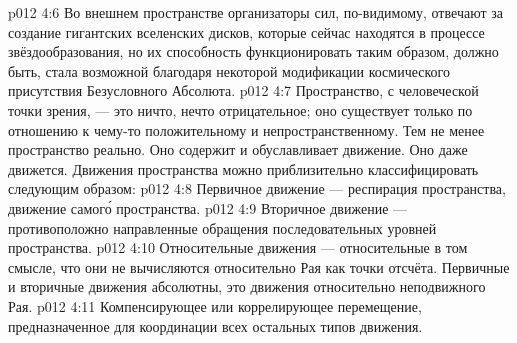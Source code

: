 \vs p012 4:6 \pc Во внешнем пространстве организаторы сил, по\hyp{}видимому, отвечают за создание гигантских вселенских дисков, которые сейчас находятся в процессе звёздообразования, но их способность функционировать таким образом, должно быть, стала возможной благодаря некоторой модификации космического присутствия Безусловного Абсолюта.
\vs p012 4:7 \pc Пространство, с человеческой точки зрения, --- это ничто, нечто отрицательное; оно существует только по отношению к чему\hyp{}то положительному и непространственному. Тем не менее пространство реально. Оно содержит и обуславливает движение. Оно даже движется. Движения пространства можно приблизительно классифицировать следующим образом:
\vs p012 4:8 Первичное движение --- респирация пространства, движение самог\'о пространства.
\vs p012 4:9 Вторичное движение --- противоположно направленные обращения последовательных уровней пространства.
\vs p012 4:10 Относительные движения --- относительные в том смысле, что они не вычисляются относительно Рая как точки отсчёта. Первичные и вторичные движения абсолютны, это движения относительно неподвижного Рая.
\vs p012 4:11 Компенсирующее или коррелирующее перемещение, предназначенное для координации всех остальных типов движения.
